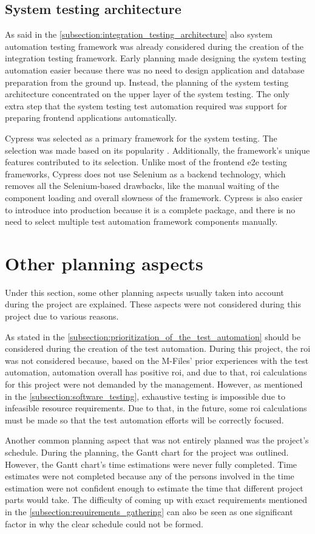 \subsection{System testing architecture}
As said in the \autoref{subsection:integration_testing_architecture} also system automation testing framework was already considered during the creation of the integration testing framework. Early planning made designing the system testing automation easier because there was no need to design application and database preparation from the ground up. Instead, the planning of the system testing architecture concentrated on the upper layer of the system testing. The only extra step that the system testing test automation required was support for preparing frontend applications automatically.

Cypress was selected as a primary framework for the system testing. The selection was made based on its popularity \cite{stateofjs2021}. Additionally, the framework's unique features contributed to its selection. Unlike most of the frontend \gls{e2e} testing frameworks, Cypress does not use Selenium as a backend technology, which removes all the Selenium-based drawbacks, like the manual waiting of the component loading and overall slowness of the framework. Cypress is also easier to introduce into production because it is a complete package, and there is no need to select multiple test automation framework components manually. \cite{cypress2022features, cypress2022how}

\section{Other planning aspects}\label{section:other_planning_aspects}
Under this section, some other planning aspects usually taken into account during the project are explained. These aspects were not considered during this project due to various reasons.

As stated in the \autoref{subsection:prioritization_of_the_test_automation}  should be considered during the creation of the test automation. During this project, the \gls{roi} was not considered because, based on the M-Files' prior experiences with the test automation, automation overall has positive \gls{roi}, and due to that, \gls{roi} calculations for this project were not demanded by the management. However, as mentioned in the \autoref{subsection:software_testing}, exhaustive testing is impossible due to infeasible resource requirements. Due to that, in the future, some \gls{roi} calculations must be made so that the test automation efforts will be correctly focused.

Another common planning aspect that was not entirely planned was the project's schedule. During the planning, the Gantt chart for the project was outlined. However, the Gantt chart's time estimations were never fully completed. Time estimates were not completed because any of the persons involved in the time estimation were not confident enough to estimate the time that different project parts would take. The difficulty of coming up with exact requirements mentioned in the \autoref{subsection:requirements_gathering} can also be seen as one significant factor in why the clear schedule could not be formed.